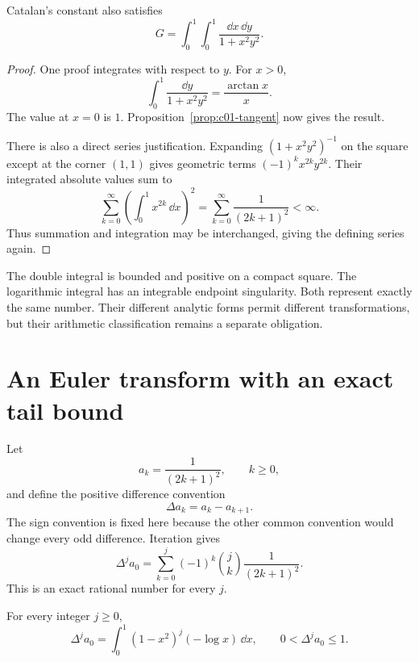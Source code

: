 \begin{proposition}
\label{prop:c01-double}
Catalan's constant also satisfies
\begin{equation}
G=\int_0^1\int_0^1\frac{\dd x\,\dd y}{1+x^2y^2}.
\label{eq:c01-double}
\end{equation}
\end{proposition}

\begin{proof}
One proof integrates with respect to $y$. For $x>0$,
\[
\int_0^1\frac{\dd y}{1+x^2y^2}=\frac{\arctan x}{x}.
\]
The value at $x=0$ is $1$. Proposition~\ref{prop:c01-tangent} now gives the result.

There is also a direct series justification. Expanding $(1+x^2y^2)^{-1}$ on the square except at the corner $(1,1)$ gives geometric terms $(-1)^kx^{2k}y^{2k}$. Their integrated absolute values sum to
\[
\sum_{k=0}^{\infty}\left(\int_0^1x^{2k}\,\dd x\right)^2
=\sum_{k=0}^{\infty}\frac1{(2k+1)^2}<\infty.
\]
Thus summation and integration may be interchanged, giving the defining series again.
\end{proof}

The double integral is bounded and positive on a compact square. The logarithmic integral has an integrable endpoint singularity. Both represent exactly the same number. Their different analytic forms permit different transformations, but their arithmetic classification remains a separate obligation.

\section{An Euler transform with an exact tail bound}

Let
\[
a_k=\frac1{(2k+1)^2},\qquad k\geq0,
\]
and define the positive difference convention
\begin{equation}
\Delta a_k=a_k-a_{k+1}.
\label{eq:c01-difference-convention}
\end{equation}
The sign convention is fixed here because the other common convention would change every odd difference. Iteration gives
\begin{equation}
\Delta^j a_0=\sum_{k=0}^{j}(-1)^k\binom jk\frac1{(2k+1)^2}.
\label{eq:c01-finite-difference}
\end{equation}
This is an exact rational number for every $j$.

\begin{lemma}
\label{lem:c01-positive-differences}
For every integer $j\geq0$,
\begin{equation}
\Delta^j a_0
=\int_0^1(1-x^2)^j(-\log x)\,\dd x,
\qquad 0<\Delta^j a_0\leq1.
\label{eq:c01-positive-differences}
\end{equation}
\end{lemma}

